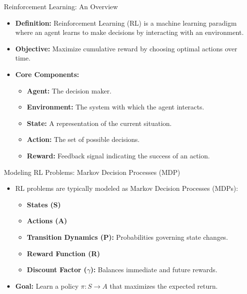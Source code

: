 \documentclass{beamer}
\begin{document}
\begin{frame}{Reinforcement Learning: An Overview}
   \begin{itemize}[<+->]
       \item \textbf{Definition:} Reinforcement Learning (RL) is a machine learning paradigm where an agent learns to make decisions by interacting with an environment.
       \item \textbf{Objective:} Maximize cumulative reward by choosing optimal actions over time.
       \item \textbf{Core Components:}
         \begin{itemize}[<+->]
             \item \textbf{Agent:} The decision maker.
             \item \textbf{Environment:} The system with which the agent interacts.
             \item \textbf{State:} A representation of the current situation.
             \item \textbf{Action:} The set of possible decisions.
             \item \textbf{Reward:} Feedback signal indicating the success of an action.
         \end{itemize}
   \end{itemize}
\end{frame}

\begin{frame}{Modeling RL Problems: Markov Decision Processes (MDP)}
   \begin{itemize}[<+->]
       \item RL problems are typically modeled as Markov Decision Processes (MDPs):
         \begin{itemize}[<+->]
             \item \textbf{States (S)}
             \item \textbf{Actions (A)}
             \item \textbf{Transition Dynamics (P):} Probabilities governing state changes.
             \item \textbf{Reward Function (R)}
             \item \textbf{Discount Factor ($\gamma$):} Balances immediate and future rewards.
         \end{itemize}
       \item \textbf{Goal:} Learn a policy $\pi: S \rightarrow A$ that maximizes the expected return.
   \end{itemize}
\end{frame}
\end{document}
